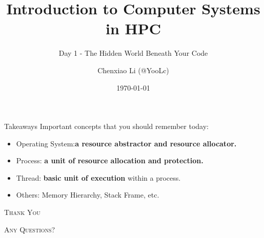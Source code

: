 \documentclass{zjusct-beamer/zjusctbeamer}
\title{Introduction to Computer Systems in HPC}
\subtitle{Day 1 - The Hidden World Beneath Your Code}
\author[YooLc]{Chenxiao Li (@YooLc)}
\date{\today}
\institute[ZJUSCT]{Zhejiang University Supercomputing Team}
\begin{document}
\setmonofont{DejaVu Sans Mono}

\maketitle

\cutoc








\begin{frame}[fragile]{Takeaways}
	 Important concepts that you should remember today:
	\begin{itemize}
		\item Operating System:\textbf{a resource abstractor and resource allocator.}
		\item Process: \textbf{a unit of resource allocation and protection.}
		\item Thread: \textbf{basic unit of execution} within a process.
		\item Others: Memory Hierarchy, Stack Frame, etc.
	\end{itemize}
\end{frame}

\begin{frame}[standout]
	\Huge\textsc{Thank You}

	\vfill

	\LARGE\textsc{Any Questions?}
\end{frame}
\end{document}
